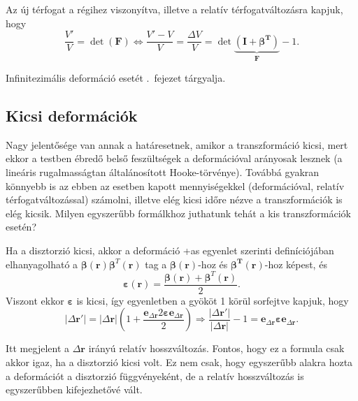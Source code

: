 \documentclass[12pt,a4paper]{scrartcl}
\let\mathbf\bm
\begin{document}
Az új térfogat a régihez viszonyítva, illetve a relatív térfogatváltozásra kapjuk, hogy
\begin{equation} \label{eq:rel_terfogatv}
\frac{{V'}}{V} = \det \left( {\mathbf{F}} \right) \Leftrightarrow \frac{{V' - V}}{V} = \frac{{\Delta V}}{V} = \det \underbrace {\left( {{\mathbf{I}} + {\mathbf{\beta^T }}} \right)}_{\mathbf{F}} - 1.
\end{equation}

Infinitezimális deformáció esetét .\ fejezet tárgyalja.

\subsection{Kicsi deformációk} \label{sec:kicsi_def}
Nagy jelentősége van annak a határesetnek, amikor a transzformáció kicsi, mert ekkor a testben ébredő belső feszültségek a deformációval arányosak lesznek (a lineáris rugalmasságtan általánosított Hooke-törvénye). Továbbá gyakran könnyebb is az ebben az esetben kapott mennyiségekkel (deformációval, relatív térfogatváltozással) számolni, illetve elég kicsi időre nézve a transzformációk is elég kicsik. Milyen egyszerűbb formálkhoz juthatunk tehát a kis transzformációk esetén?

Ha a disztorzió kicsi, akkor a deformáció \told{}+as{} egyenlet szerinti definíciójában elhanyagolható a ${\mathbf{\beta }}\left( {\mathbf{r}} \right){{\mathbf{\beta }}^T}\left( {\mathbf{r}} \right)$ tag a ${\mathbf{\beta}}\left( {\mathbf{r}} \right)$-hoz és ${\mathbf{\beta^T}}\left( {\mathbf{r}} \right)$-hoz képest, és 
\begin{equation}
{\mathbf{\varepsilon }}\left( {\mathbf{r}} \right) = \frac{{{\mathbf{\beta }}\left( {\mathbf{r}} \right) + {{\mathbf{\beta }}^T}\left( {\mathbf{r}} \right)}}{2}.
\end{equation}
Viszont ekkor ${\mathbf{\varepsilon }}$ is kicsi, így \az{\eqref{eq:deform_def}} egyenletben a gyököt 1 körül sorfejtve kapjuk, hogy
\[\left| {\Delta {\mathbf{r}}'} \right| = \left| {\Delta {\mathbf{r}}} \right|\left( {1 + \frac{{{{\mathbf{e}}_{\Delta {\mathbf{r}}}}2{\mathbf{\varepsilon }}{{\mathbf{e}}_{\Delta {\mathbf{r}}}}}}{2}} \right) \Rightarrow \frac{{\left| {\Delta {\mathbf{r}}'} \right|}}{{\left| {\Delta {\mathbf{r}}} \right|}} - 1 = {{\mathbf{e}}_{\Delta {\mathbf{r}}}}{\mathbf{\varepsilon }}{{\mathbf{e}}_{\Delta {\mathbf{r}}}}.\]

Itt megjelent a ${\Delta {\mathbf{r}}}$ irányú relatív hosszváltozás. Fontos, hogy ez a formula csak akkor igaz, ha a disztorzió kicsi volt. Ez nem csak, hogy egyszerűbb alakra hozta a deformációt a disztorzió függvényeként, de a relatív hosszváltozás is egyszerűbben kifejezhetővé vált.
\end{document}
